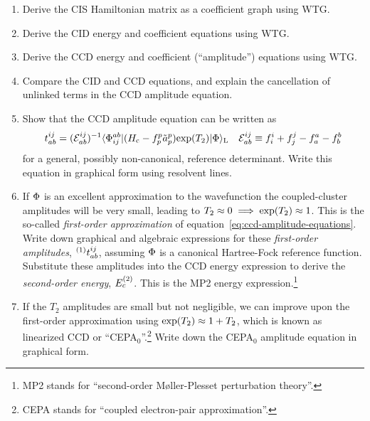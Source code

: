 \documentclass[11pt]{article}
\begin{document}
\begin{enumerate}
\item
  Derive the CIS Hamiltonian matrix as a coefficient graph using WTG.

\item
  Derive the CID energy and coefficient equations using WTG.

\item\label{item:ccd}
  Derive the CCD energy and coefficient (``amplitude'') equations using WTG.

\item
  Compare the CID and CCD equations, and explain the cancellation of unlinked terms in the CCD amplitude equation.

\item\label{item:ccd-final}
  Show that the CCD amplitude equation can be written as
\begin{align}
\label{eq:ccd-amplitude-equations}
  t_{ab}^{ij}
=
  (\mathcal{E}_{ab}^{ij})^{-1}
  \langle\Phi _{ij}^{ab}|
    (H_{\mathrm{c}} - f_p^p\tilde{a}^p_p)
    \mathrm{exp}(T_2)
  |\Phi \rangle_{\mathrm{L}}
&&
  \mathcal{E}_{ab}^{ij}
\equiv
  f_i^i
+
  f_j^j
-
  f_a^a
-
  f_b^b
\end{align}
  for a general, possibly non-canonical, reference determinant.
  Write this equation in graphical form using resolvent lines.

\item
  If $\Phi $ is an excellent approximation to the wavefunction the coupled-cluster amplitudes will be very small, leading to $T_2\approx 0\implies\mathrm{exp}(T_2)\approx 1$.
  This is the so-called \textit{first-order approximation} of equation~\ref{eq:ccd-amplitude-equations}.
  Write down graphical and algebraic expressions for these \textit{first-order amplitudes}, ${}^{(1)}t_{ab}^{ij}$, assuming $\Phi $ is a canonical Hartree-Fock reference function.
  Substitute these amplitudes into the CCD energy expression to derive the \textit{second-order energy}, $E_c^{(2)}$.
  This is the MP2 energy expression.\footnote{MP2 stands for ``second-order M\o ller-Plesset perturbation theory''.}

\item
  If the $T_2$ amplitudes are small but not negligible, we can improve upon the first-order approximation using $\mathrm{exp}(T_2)\approx 1 + T_2$, which is known as linearized CCD or ``CEPA$_0$''.\footnote{CEPA stands for ``coupled electron-pair approximation''.}
  Write down the CEPA$_0$ amplitude equation in graphical form.


\end{enumerate}
\end{document}
